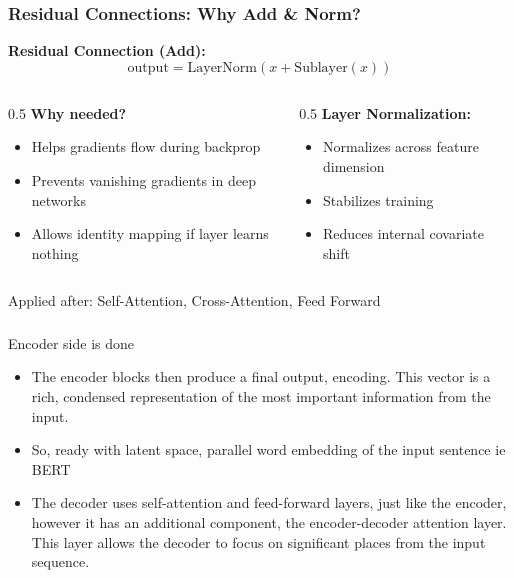 \begin{frame}[fragile]\frametitle{Residual Connections: Why Add \& Norm?}

\textbf{Residual Connection (Add):}
$$\text{output} = \text{LayerNorm}(x + \text{Sublayer}(x))$$

\begin{columns}
  \begin{column}[T]{0.5\linewidth}
    \textbf{Why needed?}
    \begin{itemize}
    \item Helps gradients flow during backprop
    \item Prevents vanishing gradients in deep networks
    \item Allows identity mapping if layer learns nothing
    \end{itemize}
  \end{column}
  \begin{column}[T]{0.5\linewidth}
    \textbf{Layer Normalization:}
    \begin{itemize}
    \item Normalizes across feature dimension
    \item Stabilizes training
    \item Reduces internal covariate shift
    \end{itemize}
  \end{column}
\end{columns}

Applied after: Self-Attention, Cross-Attention, Feed Forward
\end{frame}

\begin{frame}[fragile]\frametitle{}
\begin{center}
{\Large Encoder side is done}
\end{center}

\begin{itemize}
\item The encoder blocks then produce a final output, encoding. This vector is a rich, condensed representation of the most important information from the input.
\item So, ready with latent space, parallel word embedding of the input sentence ie BERT
\item The decoder uses self-attention and feed-forward layers, just like the encoder, however it has an additional component, the encoder-decoder attention layer. This layer allows the decoder to focus on significant places from the input sequence.
\end{itemize}

\end{frame}




